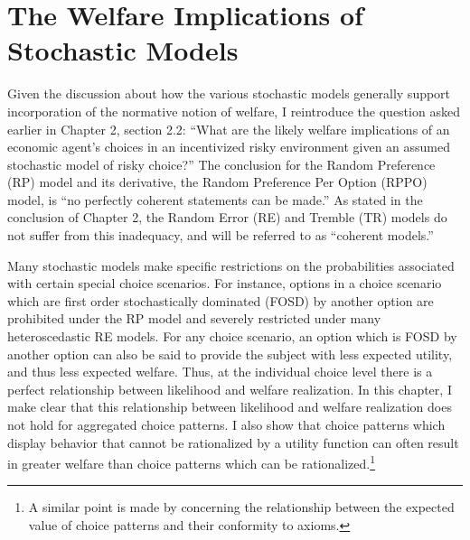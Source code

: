 \documentclass[../main.tex]{subfiles}
\begin{document}
\doublespacing
\setcounter{chapter}{2}

\singlespacing
\chapter{The Welfare Implications of Stochastic Models}
\doublespacing

\lltoc %

Given the discussion about how the various stochastic models generally support incorporation of the normative notion of welfare, I reintroduce the question asked earlier in Chapter 2, section 2.2:
\enquote{What are the likely welfare implications of an economic agent's choices in an incentivized risky environment given an assumed stochastic model of risky choice?}
The conclusion for the Random Preference (RP) model and its derivative, the Random Preference Per Option (RPPO) model, is \enquote{no perfectly coherent statements can be made.}
As stated in the conclusion of Chapter 2, the Random Error (RE) and Tremble (TR) models do not suffer from this inadequacy, and will be referred to as \enquote{coherent models.}

Many stochastic models make specific restrictions on the probabilities associated with certain special choice scenarios.
For instance, options in a choice scenario which are first order stochastically dominated (FOSD) by another option are prohibited under the RP model and severely restricted under many heteroscedastic RE models.
For any choice scenario, an option which is FOSD by another option can also be said to provide the subject with less expected utility, and thus less expected welfare.
Thus, at the individual choice level there is a perfect relationship between likelihood and welfare realization.
In this chapter, I make clear that this relationship between likelihood and welfare realization does not hold for aggregated choice patterns.
I also show that choice patterns which display behavior that cannot be rationalized by a utility function can often result in greater welfare than choice patterns which can be rationalized.\footnote{
	A similar point is made by \textcite[1402]{Wilcox1993} concerning the relationship between the expected value of choice patterns and their conformity to axioms.
}
\end{document}
